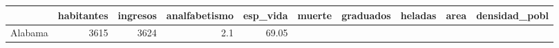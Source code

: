 \documentclass[]{article}
\begin{document}
\begin{longtable}[]{@{}lrrrrrrrrr@{}}
\toprule
\begin{minipage}[b]{0.08\columnwidth}\raggedright\strut
\strut
\end{minipage} & \begin{minipage}[b]{0.08\columnwidth}\raggedleft\strut
habitantes\strut
\end{minipage} & \begin{minipage}[b]{0.07\columnwidth}\raggedleft\strut
ingresos\strut
\end{minipage} & \begin{minipage}[b]{0.10\columnwidth}\raggedleft\strut
analfabetismo\strut
\end{minipage} & \begin{minipage}[b]{0.07\columnwidth}\raggedleft\strut
esp\_vida\strut
\end{minipage} & \begin{minipage}[b]{0.05\columnwidth}\raggedleft\strut
muerte\strut
\end{minipage} & \begin{minipage}[b]{0.07\columnwidth}\raggedleft\strut
graduados\strut
\end{minipage} & \begin{minipage}[b]{0.06\columnwidth}\raggedleft\strut
heladas\strut
\end{minipage} & \begin{minipage}[b]{0.05\columnwidth}\raggedleft\strut
area\strut
\end{minipage} & \begin{minipage}[b]{0.10\columnwidth}\raggedleft\strut
densidad\_pobl\strut
\end{minipage}\tabularnewline
\midrule
\endhead
\begin{minipage}[t]{0.08\columnwidth}\raggedright\strut
Alabama\strut
\end{minipage} & \begin{minipage}[t]{0.08\columnwidth}\raggedleft\strut
3615\strut
\end{minipage} & \begin{minipage}[t]{0.07\columnwidth}\raggedleft\strut
3624\strut
\end{minipage} & \begin{minipage}[t]{0.10\columnwidth}\raggedleft\strut
2.1\strut
\end{minipage} & \begin{minipage}[t]{0.07\columnwidth}\raggedleft\strut
69.05\strut
\end{minipage} & \begin{minipage}[t]{0.05\columnwidth}\raggedleft\strut

\end{minipage}
\end{longtable}
\end{document}
